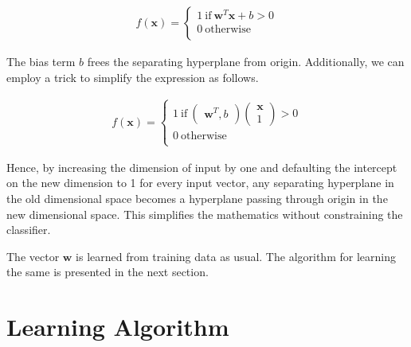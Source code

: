 \documentclass[11pt, a4paper]{article}
\begin{document}
\begin{align*}
	f(\boldsymbol{x}) = \left\{                           
	\begin{array}{ll}                                     
	1\ \text{if}\ \boldsymbol{w}^T \boldsymbol{x} + b > 0 \\
	0\ \text{otherwise}                                   \\
	\end{array}                                           
	\right.                                               
\end{align*}

The bias term $b$ frees the separating hyperplane from origin. Additionally, we can employ a trick to simplify the expression as follows.

\begin{align*}
	f(\boldsymbol{x}) = \left\{                                                                    
	\begin{array}{ll}                                                                              
	1\ \text{if}\ \begin{pmatrix} \boldsymbol{w}^T, b \end{pmatrix} \begin{pmatrix} \boldsymbol{x} \\ 
	1 \end{pmatrix} > 0                                                                            \\
	0\ \text{otherwise}                                                                            \\
	\end{array}                                                                                    
	\right.                                                                                        
\end{align*}

Hence, by increasing the dimension of input by one and defaulting the intercept on the new dimension to 1 for every input vector, any separating hyperplane in the old dimensional space 
becomes a hyperplane passing through origin in the new dimensional space. This simplifies the mathematics without constraining the classifier.

The vector $\boldsymbol{w}$ is learned from training data as usual. The algorithm for learning the same is presented in the next section. 

\section{Learning Algorithm}
	
\end{document}

